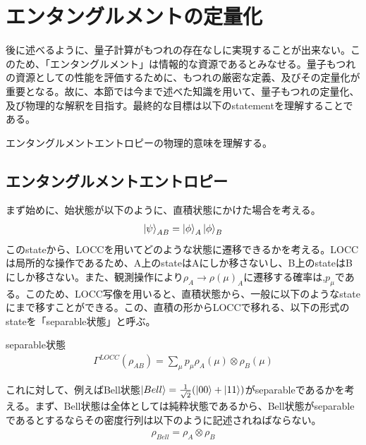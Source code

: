 \documentclass[a4paper,10.5pt]{article}
\numberwithin{equation}{section}
\begin{document}
\section{エンタングルメントの定量化}
後に述べるように、量子計算がもつれの存在なしに実現することが出来ない。このため、「エンタングルメント」は情報的な資源であるとみなせる。量子もつれの資源としての性能を評価するために、もつれの厳密な定義、及びその定量化が重要となる。故に、本節では今まで述べた知識を用いて、量子もつれの定量化、及び物理的な解釈を目指す。最終的な目標は以下のstatementを理解することである。
\begin{goalbox}
エンタングルメントエントロピーの物理的意味を理解する。
\end{goalbox}


\subsection{エンタングルメントエントロピー}
まず始めに、始状態が以下のように、直積状態にかけた場合を考える。
\begin{equation}\begin{split}
\ket{\psi}_{AB}=\ket{\phi}_{A}\ket{\phi}_{B}
\end{split} \end{equation}
このstateから、LOCCを用いてどのような状態に遷移できるかを考える。LOCCは局所的な操作であるため、A上のstateはAにしか移さないし、B上のstateはBにしか移さない。また、観測操作により$\rho_{A}\to \rho(\mu)_{A}$に遷移する確率は,$p_{\mu}$である。このため、LOCC写像を用いると、直積状態から、一般に以下のようなstateにまで移すことができる。この、直積の形からLOCCで移れる、以下の形式のstateを「separable状態」と呼ぶ。
\begin{defbox}{separable状態}
\begin{equation}\begin{split}
    \Gamma^{LOCC}(\rho_{AB}) = \sum_{\mu} p_{\mu} \rho_{A}(\mu) \otimes \rho_{B}(\mu)
    \label{LOCC_two}
\end{split} \end{equation}
\end{defbox}
これに対して、例えばBell状態$\ket{Bell}=\frac{1}{\sqrt{2}}(\ket{00}+\ket{11})$がseparableであるかを考える。まず、Bell状態は全体としては純粋状態であるから、Bell状態がseparableであるとするならその密度行列は以下のように記述されねばならない。
\begin{equation}\begin{split}
\rho_{Bell}=\rho_{A}\otimes\rho_{B}
\end{split} \end{equation}
\end{document}
